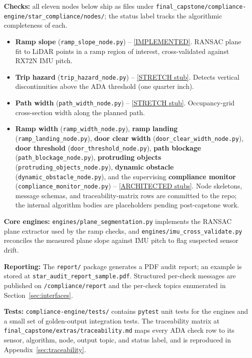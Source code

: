 \documentclass[11pt,letterpaper]{article}
\newcommand{\statuslabel}[1]{\hyperref[sec:status-legend]{[#1]}}
\begin{document}
\textbf{Checks:} all eleven nodes below ship as files under
\texttt{final\_capstone/compliance-engine/star\_compliance/nodes/};
the status label tracks the algorithmic completeness of each.
\begin{itemize}[leftmargin=1.4em,itemsep=2pt]
\item \textbf{Ramp slope} (\texttt{ramp\_slope\_node.py}) --
      \statuslabel{IMPLEMENTED}. RANSAC plane fit to LiDAR points in a
      ramp region of interest, cross-validated against RX72N IMU pitch.
\item \textbf{Trip hazard} (\texttt{trip\_hazard\_node.py}) --
      \statuslabel{STRETCH stub}. Detects vertical discontinuities above
      the ADA threshold (one quarter inch).
\item \textbf{Path width} (\texttt{path\_width\_node.py}) --
      \statuslabel{STRETCH stub}. Occupancy-grid cross-section width
      along the planned path.
\item \textbf{Ramp width} (\texttt{ramp\_width\_node.py}),
      \textbf{ramp landing} (\texttt{ramp\_landing\_node.py}),
      \textbf{door clear width} (\texttt{door\_clear\_width\_node.py}),
      \textbf{door threshold} (\texttt{door\_threshold\_node.py}),
      \textbf{path blockage} (\texttt{path\_blockage\_node.py}),
      \textbf{protruding objects} (\texttt{protruding\_objects\_node.py}),
      \textbf{dynamic obstacle} (\texttt{dynamic\_obstacle\_node.py}),
      and the supervising \textbf{compliance monitor}
      (\texttt{compliance\_monitor\_node.py}) -- \statuslabel{ARCHITECTED stubs}.
      Node skeletons, message schemas, and traceability-matrix rows
      are committed to the repo; the internal algorithm bodies are
      placeholders pending post-capstone work.
\end{itemize}

\textbf{Core engines:} \texttt{engines/plane\_segmentation.py}
implements the RANSAC plane extractor used by the ramp checks, and
\texttt{engines/imu\_cross\_validate.py} reconciles the measured
plane slope against IMU pitch to flag suspected sensor drift.

\textbf{Reporting:} The \texttt{report/} package generates a PDF
audit report; an example is stored at
\texttt{star\_audit\_report\_sample.pdf}. Structured per-check
messages are published on \texttt{/compliance/report} and the
per-check topics enumerated in Section~\ref{sec:interfaces}.

\textbf{Tests:} \texttt{compliance-engine/tests/} contains
\texttt{pytest} unit tests for the engines and a small set of
golden-output integration tests. The traceability matrix at
\texttt{final\_capstone/extras/traceability.md} maps every ADA check
row to its sensor, algorithm, node, output topic, and status label,
and is reproduced in Appendix~\ref{sec:traceability}.
\end{document}
